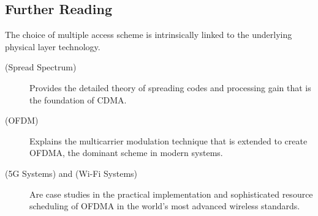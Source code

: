 \begin{importantbox}
\section*{Further Reading}
The choice of multiple access scheme is intrinsically linked to the underlying physical layer technology.
\begin{description}
    \item[ (Spread Spectrum)] Provides the detailed theory of spreading codes and processing gain that is the foundation of CDMA.
    \item[ (OFDM)] Explains the multicarrier modulation technique that is extended to create OFDMA, the dominant scheme in modern systems.
    \item[ (5G Systems) and  (Wi-Fi Systems)] Are case studies in the practical implementation and sophisticated resource scheduling of OFDMA in the world's most advanced wireless standards.
\end{description}
\end{importantbox}